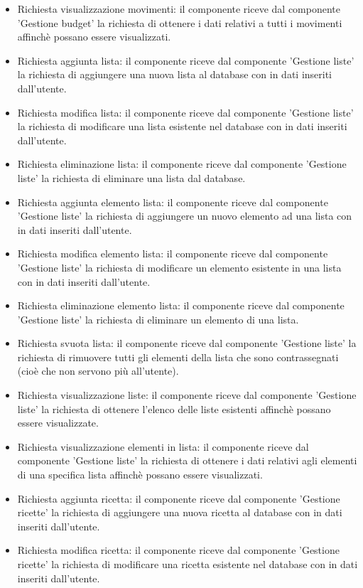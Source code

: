 \documentclass[a4paper,12pt]{article}
\begin{document}
\begin{itemize}
\item {\sffamily Richiesta visualizzazione movimenti}: il componente riceve dal componente 'Gestione budget' la richiesta di ottenere i dati relativi a tutti i movimenti affinchè possano essere visualizzati.
\item {\sffamily Richiesta aggiunta lista}: il componente riceve dal componente 'Gestione liste' la richiesta di aggiungere una nuova lista al database con in dati inseriti dall'utente.
\item {\sffamily Richiesta modifica lista}: il componente riceve dal componente 'Gestione liste' la richiesta di modificare una lista esistente nel database con in dati inseriti dall'utente.
\item {\sffamily Richiesta eliminazione lista}: il componente riceve dal componente 'Gestione liste' la richiesta di eliminare una lista dal database.
\item {\sffamily Richiesta aggiunta elemento lista}: il componente riceve dal componente 'Gestione liste' la richiesta di aggiungere un nuovo elemento ad una lista con in dati inseriti dall'utente.
\item {\sffamily Richiesta modifica elemento lista}: il componente riceve dal componente 'Gestione liste' la richiesta di modificare un elemento esistente in una lista con in dati inseriti dall'utente.
\item {\sffamily Richiesta eliminazione elemento lista}: il componente riceve dal componente 'Gestione liste' la richiesta di eliminare un elemento di una lista.
\item {\sffamily Richiesta svuota lista}: il componente riceve dal componente 'Gestione liste' la richiesta di rimuovere tutti gli elementi della lista che sono contrassegnati (cioè che non servono più all'utente).
\item {\sffamily Richiesta visualizzazione liste}: il componente riceve dal componente 'Gestione liste' la richiesta di ottenere l'elenco delle liste esistenti affinchè possano essere visualizzate.
\item {\sffamily Richiesta visualizzazione elementi in lista}: il componente riceve dal componente 'Gestione liste' la richiesta di ottenere i dati relativi agli elementi di una specifica lista affinchè possano essere visualizzati.
\item {\sffamily Richiesta aggiunta ricetta}: il componente riceve dal componente 'Gestione ricette' la richiesta di aggiungere una nuova ricetta al database con in dati inseriti dall'utente.
\item {\sffamily Richiesta modifica ricetta}: il componente riceve dal componente 'Gestione ricette' la richiesta di modificare una ricetta esistente nel database con in dati inseriti dall'utente.

\end{itemize}
\end{document}

